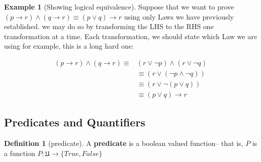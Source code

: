\documentclass[letterpaper,10pt]{article}
\theoremstyle{plain}
\theoremstyle{definition}
\newtheorem{defn}[thm]{Definition}
\newtheorem{exmp}[thm]{Example}
\theoremstyle{remark}
\providecommand{\land}{\ensuremath{\wedge}}
\providecommand{\lor}{\ensuremath{\vee}}
\begin{document}
\newpage
\begin{exmp}[Showing logical equivalence]
Suppose that we want to prove $(p \to r) \land (q \to r) \equiv (p \lor q) \to r$ using only Laws we have previously established.
we may do so by transforming the LHS to the RHS one transformation at a time. Each transformation, we should state which Law we are using for example, this is a long hard one:

\begin{align*}
(p \to r) \land (q \to r) \equiv& (r \lor \lnot p) \land (r\lor \lnot q)\\
&\equiv (r \lor (\lnot p \land \lnot q))\\
&\equiv (r \lor \lnot (p \lor q))\\
&\equiv (p \lor q) \to r
\end{align*}
\end{exmp}

\newpage 
\subsection{Predicates and Quantifiers}

\begin{defn}[predicate]
A \textbf{predicate} is a boolean valued function-- that is, $P$ is a function $P: \mathfrak{U} \to \{True,False\}$
\end{defn}
\end{document}
